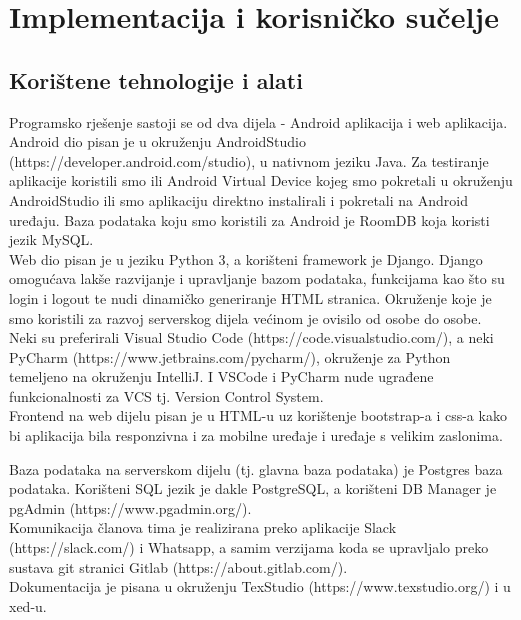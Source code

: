 \chapter{Implementacija i korisničko sučelje}
	\section{Korištene tehnologije i alati}
		Programsko rješenje sastoji se od dva dijela - Android aplikacija i web aplikacija. \\
		
		Android dio pisan je u okruženju AndroidStudio (https://developer.android.com/studio), u nativnom jeziku Java. Za testiranje aplikacije koristili smo ili Android Virtual Device kojeg smo pokretali u okruženju AndroidStudio ili smo aplikaciju direktno instalirali i pokretali na Android uređaju. Baza podataka koju smo koristili za Android je RoomDB koja koristi jezik MySQL. \\
		
		Web dio pisan je u jeziku Python 3, a korišteni framework je Django. Django omogućava lakše razvijanje i upravljanje bazom podataka, funkcijama kao što su login i logout te nudi dinamičko generiranje HTML stranica. Okruženje koje je smo koristili za razvoj serverskog dijela većinom je ovisilo od osobe do osobe. Neki su preferirali Visual Studio Code (https://code.visualstudio.com/), a neki PyCharm (https://www.jetbrains.com/pycharm/), okruženje za Python temeljeno na okruženju IntelliJ. I VSCode i PyCharm nude ugrađene funkcionalnosti za VCS tj. Version Control System. \\
		
		Frontend na web dijelu pisan je u HTML-u uz korištenje bootstrap-a i css-a kako bi aplikacija bila responzivna i za mobilne uređaje i uređaje s velikim zaslonima.
		
		Baza podataka na serverskom dijelu (tj. glavna baza podataka) je Postgres baza podataka. Korišteni SQL jezik je dakle PostgreSQL, a korišteni DB Manager je pgAdmin (https://www.pgadmin.org/). \\
		
		Komunikacija članova tima je realizirana preko aplikacije Slack (https://slack.com/) i Whatsapp, a samim verzijama koda se upravljalo preko sustava git stranici Gitlab (https://about.gitlab.com/). \\
		
		Dokumentacija je pisana u okruženju TexStudio (https://www.texstudio.org/) i u xed-u. \\
		
